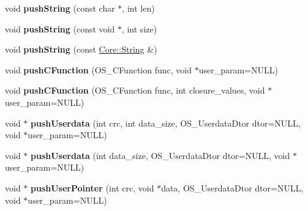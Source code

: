 \begin{DoxyCompactItemize}
\item 
void {\bfseries push\+String} (const char $\ast$, int len)\hypertarget{class_object_script_1_1_o_s_a067651a053f5d15fd6814c2245bd65a2}{}\label{class_object_script_1_1_o_s_a067651a053f5d15fd6814c2245bd65a2}

\item 
void {\bfseries push\+String} (const void $\ast$, int size)\hypertarget{class_object_script_1_1_o_s_a1df8074f53a6fedb472223641419ae72}{}\label{class_object_script_1_1_o_s_a1df8074f53a6fedb472223641419ae72}

\item 
void {\bfseries push\+String} (const \hyperlink{class_object_script_1_1_o_s_1_1_core_1_1_string}{Core\+::\+String} \&)\hypertarget{class_object_script_1_1_o_s_a4f36ea6c36080c0a498bca0a37cec797}{}\label{class_object_script_1_1_o_s_a4f36ea6c36080c0a498bca0a37cec797}

\item 
void {\bfseries push\+C\+Function} (O\+S\+\_\+\+C\+Function func, void $\ast$user\+\_\+param=N\+U\+LL)\hypertarget{class_object_script_1_1_o_s_a77b3404a6c4368f8f22f32dfed72b696}{}\label{class_object_script_1_1_o_s_a77b3404a6c4368f8f22f32dfed72b696}

\item 
void {\bfseries push\+C\+Function} (O\+S\+\_\+\+C\+Function func, int closure\+\_\+values, void $\ast$user\+\_\+param=N\+U\+LL)\hypertarget{class_object_script_1_1_o_s_afd0021a5864e0732866f4c4b8a4cc313}{}\label{class_object_script_1_1_o_s_afd0021a5864e0732866f4c4b8a4cc313}

\item 
void $\ast$ {\bfseries push\+Userdata} (int crc, int data\+\_\+size, O\+S\+\_\+\+Userdata\+Dtor dtor=N\+U\+LL, void $\ast$user\+\_\+param=N\+U\+LL)\hypertarget{class_object_script_1_1_o_s_a5746887338ab6fe06b5cccb17b13c851}{}\label{class_object_script_1_1_o_s_a5746887338ab6fe06b5cccb17b13c851}

\item 
void $\ast$ {\bfseries push\+Userdata} (int data\+\_\+size, O\+S\+\_\+\+Userdata\+Dtor dtor=N\+U\+LL, void $\ast$user\+\_\+param=N\+U\+LL)\hypertarget{class_object_script_1_1_o_s_a7559a3971d9625c0ae6f27f3d1b0affd}{}\label{class_object_script_1_1_o_s_a7559a3971d9625c0ae6f27f3d1b0affd}

\item 
void $\ast$ {\bfseries push\+User\+Pointer} (int crc, void $\ast$data, O\+S\+\_\+\+Userdata\+Dtor dtor=N\+U\+LL, void $\ast$user\+\_\+param=N\+U\+LL)\hypertarget{class_object_script_1_1_o_s_ad0a02ab4a1633933a3bba81e184aeb5e}{}\label{class_object_script_1_1_o_s_ad0a02ab4a1633933a3bba81e184aeb5e}


\end{DoxyCompactItemize}
